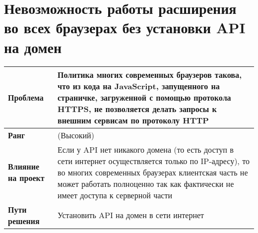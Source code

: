 	\section{Невозможность работы расширения во всех браузерах без установки API на домен}
		\begin{tabularx}{\textwidth}{
				| >{\centering\arraybackslash\hsize=4cm}X
				| >{\centering\arraybackslash}X
				|}
			\hline
			\textbf{Проблема} & Политика многих современных браузеров такова, что из кода на JavaScript, запущенного на страничке, загруженной с помощью протокола HTTPS, не позволяется делать запросы к внешним сервисам по протоколу HTTP \\\hline
			\textbf{Ранг} &  10 (Высокий) \\\hline
			\textbf{Влияние на проект} & Если у API нет никакого домена (то есть доступ в сети интернет осуществляется только по IP-адресу), то во многих современных браузерах клиентская часть не может работать полноценно так как фактически не имеет доступа к серверной части \\\hline
			\textbf{Пути решения} & Установить API на домен в сети интернет \\\hline
		\end{tabularx}
